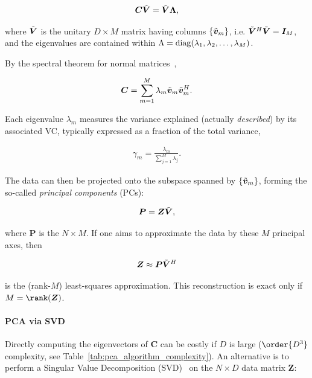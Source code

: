 \begin{align}\label{eq:theory:pca_eigenvector_decomposition}
    \bm{C} \tilde{\bm{V}} = \tilde{\bm{V}} \bm{\Lambda},
\end{align}

where $\tilde{\bm{V}}$ is the unitary $D\times M$ matrix having columns $\{\tilde{\bm{v}}_m\}$, i.e. $\tilde{\bm{V}}^H\tilde{\bm{V}}=\bm{I}_M$, and the eigenvalues are contained within $\Lambda=\operatorname*{diag}(\lambda_1, \lambda_2, \dots, \lambda_M)$.

By the spectral theorem for normal matrices~\cite[e.g.][p. 133]{horn_matrix_2012}, 

\begin{align}
    \bm{C} = \sum_{m=1}^M \lambda_m \tilde{\bm{v}}_m \tilde{\bm{v}}_m^H.
\end{align}

Each eigenvalue $\lambda_m$ measures the variance explained (actually \emph{described}) by its associated VC, typically expressed as a fraction of the total variance,

\begin{align}
    \gamma_m = \frac{\lambda_m}{\sum_{j=1}^M\lambda_j}.
\end{align}

The data can then be projected onto the subspace spanned by $\{\tilde{\bm{v}}_m\}$, forming the so-called \textit{principal components} (PCs):

\begin{equation}\label{eq:theory:pca_projection}
    \bm{P} = \bm{Z} \tilde{\bm{V}},
\end{equation}

where $\bm{P}$ is the $N\times M$. If one aims to approximate the data by these $M$ principal axes, then

\begin{align}\label{eq:theory:pca_reconstruction}
    \bm{Z} \approx \bm{P} \tilde{\bm{V}}^H
\end{align}

is the (rank-$M$) least-squares approximation. This reconstruction is exact only if $M=\rank(\bm{Z})$.

\paragraph{PCA via SVD} Directly computing the eigenvectors of $\bm{C}$ can be costly if $D$ is large ($\order{D^3}$ complexity, see Table~\ref{tab:pca_algorithm_complexity}). An alternative is to perform a Singular Value Decomposition (SVD)~\cite[e.g.][p. 150]{horn_matrix_2012} on the $N\times D$ data matrix $\bm{Z}$:

